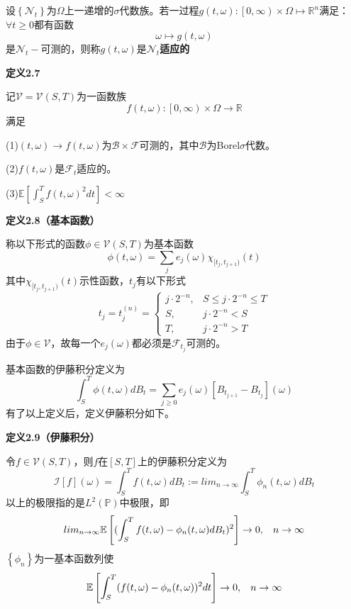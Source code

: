 \documentclass[UTF8，12pt]{ctexart}
\numberwithin{equation}{section}
\begin{document}
设$\left\{\mathcal{N}_t\right\}$为$\Omega$上一递增的$\sigma$代数族。若一过程$g(t,\omega):\left[0,\infty\right)\times\Omega\mapsto\mathbb{R}^n$满足：$\forall t\ge 0 $都有函数
\[
\omega\mapsto g(t,\omega)
\]
是$\mathcal{N}_t-$可测的，则称$g(t,\omega)$是\textbf{$\mathcal{N}_t$适应的}

\vspace{0.3cm}
\noindent \textbf{定义2.7}

记$\mathcal{V}=\mathcal{V}(S,T)$为一函数族
\[
f(t,\omega):\left[0,\infty\right)\times\Omega\to\mathbb{R}
\]
满足

\noindent (1)$(t,\omega)\to f(t,\omega)$为$\mathcal{B}\times\mathcal{F}$可测的，其中$\mathcal{B}$为Borel$\sigma$代数。

\noindent (2)$f(t,\omega)$是$\mathcal{F}_t$适应的。

\noindent (3)$\mathbb{E}\left[ \int_{S}^{T}f(t,\omega)^2 dt\right]<\infty$

\vspace{0.3cm}
\noindent \textbf{定义2.8（基本函数）}

称以下形式的函数$\phi\in\mathcal{V}(S,T)$为基本函数
\[
\phi(t,\omega)=\sum_j e_j(\omega)\chi_{[t_j,t_{j+1})}(t)
\]
其中$\chi_{[t_j,t_{j+1})}(t)$示性函数，$t_j$有以下形式
\[
t_j=t_j^{(n)}=
\begin{cases}
	j\cdot2^{-n},& S\le j\cdot2^{-n}\le T\\
	S,& j\cdot2^{-n}< S\\
	T,& j\cdot2^{-n}> T
\end{cases}
\]
由于$\phi\in\mathcal{V}$，故每一个$e_j(\omega)$都必须是$\mathcal{F}_{t_j}$可测的。

\vspace{0.3cm}
基本函数的伊藤积分定义为
\[
\int_{S}^{T}\phi(t,\omega)dB_t=\sum_{j\ge0}e_j(\omega)[B_{t_{j+1}}-B_{t_j}](\omega)
\]
有了以上定义后，定义伊藤积分如下。

\noindent \textbf{定义2.9（伊藤积分）}

令$f\in\mathcal{V}(S,T)$，则$f$在$[S,T]$上的伊藤积分定义为
\[
\mathcal{I}[f](\omega)=\int_{S}^{T}f(t,\omega)dB_t:=lim_{n\to\infty}\int_{S}^{T}\phi_n(t,\omega)dB_t
\]
以上的极限指的是$L^2(\mathbb{P})$中极限，即
\[
lim_{n\to\infty}\mathbb{E}\left[(\int_{S}^{T}f(t,\omega)-\phi_n(t,\omega)dB_t)^2\right]\to 0,\hspace{0.3cm}n\to\infty
\]
$\left\{\phi_n\right\}$为一基本函数列使
\[
\mathbb{E}\left[\int_{S}^{T}(f(t,\omega)-\phi_n(t,\omega))^2 dt\right]\to 0,\hspace{0.3cm}n\to\infty
\]
\end{document}
